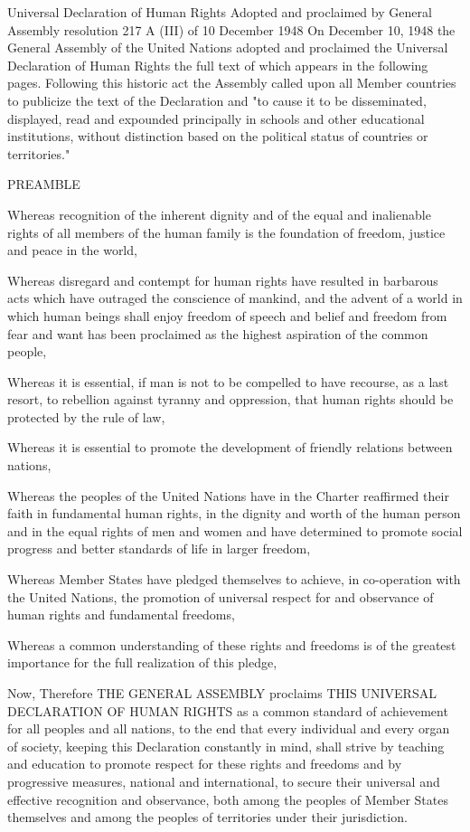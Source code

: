 \documentclass[11pt,a4paper]{article}
\begin{document}
Universal Declaration of Human Rights Adopted and proclaimed by General Assembly resolution 217 A (III) of 10 December 1948 On December 10, 1948 the General Assembly of the United Nations adopted and proclaimed the Universal Declaration of Human Rights the full text of which appears in the following pages. Following this historic act the Assembly called upon all Member countries to publicize the text of the Declaration and "to cause it to be disseminated, displayed, read and expounded principally in schools and other educational institutions, without distinction based on the political status of countries or territories."

PREAMBLE

Whereas recognition of the inherent dignity and of the equal and inalienable rights of all members of the human family is the foundation of freedom, justice and peace in the world,

Whereas disregard and contempt for human rights have resulted in barbarous acts which have outraged the conscience of mankind, and the advent of a world in which human beings shall enjoy freedom of speech and belief and freedom from fear and want has been proclaimed as the highest aspiration of the common people,

Whereas it is essential, if man is not to be compelled to have recourse, as a last resort, to rebellion against tyranny and oppression, that human rights should be protected by the rule of law,

Whereas it is essential to promote the development of friendly relations between nations,

Whereas the peoples of the United Nations have in the Charter reaffirmed their faith in fundamental human rights, in the dignity and worth of the human person and in the equal rights of men and women and have determined to promote social progress and better standards of life in larger freedom,

Whereas Member States have pledged themselves to achieve, in co-operation with the United Nations, the promotion of universal respect for and observance of human rights and fundamental freedoms,

Whereas a common understanding of these rights and freedoms is of the greatest importance for the full realization of this pledge,

Now, Therefore THE GENERAL ASSEMBLY proclaims THIS UNIVERSAL DECLARATION OF HUMAN RIGHTS as a common standard of achievement for all peoples and all nations, to the end that every individual and every organ of society, keeping this Declaration constantly in mind, shall strive by teaching and education to promote respect for these rights and freedoms and by progressive measures, national and international, to secure their universal and effective recognition and observance, both among the peoples of Member States themselves and among the peoples of territories under their jurisdiction.
\end{document}
